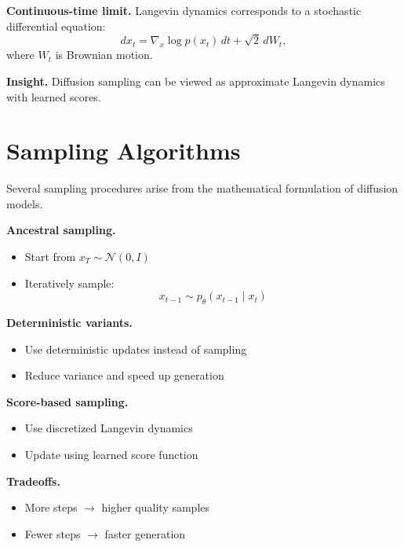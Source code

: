 \medskip

\noindent
\textbf{Continuous-time limit.}  
Langevin dynamics corresponds to a stochastic differential equation:
\[
dx_t = \nabla_x \log p(x_t)\, dt + \sqrt{2} \, dW_t,
\]
where $W_t$ is Brownian motion.

\medskip

\noindent
\textbf{Insight.}  
Diffusion sampling can be viewed as approximate Langevin dynamics with learned scores.

\section{Sampling Algorithms}

Several sampling procedures arise from the mathematical formulation of diffusion models.

\medskip

\noindent
\textbf{Ancestral sampling.}
\begin{itemize}
    \item Start from $x_T \sim \mathcal{N}(0, I)$
    \item Iteratively sample:
    \[
    x_{t-1} \sim p_\theta(x_{t-1} \mid x_t)
    \]
\end{itemize}

\medskip

\noindent
\textbf{Deterministic variants.}
\begin{itemize}
    \item Use deterministic updates instead of sampling
    \item Reduce variance and speed up generation
\end{itemize}

\medskip

\noindent
\textbf{Score-based sampling.}
\begin{itemize}
    \item Use discretized Langevin dynamics
    \item Update using learned score function
\end{itemize}

\medskip

\noindent
\textbf{Tradeoffs.}
\begin{itemize}
    \item More steps $\rightarrow$ higher quality samples
    \item Fewer steps $\rightarrow$ faster generation
\end{itemize}

\medskip


